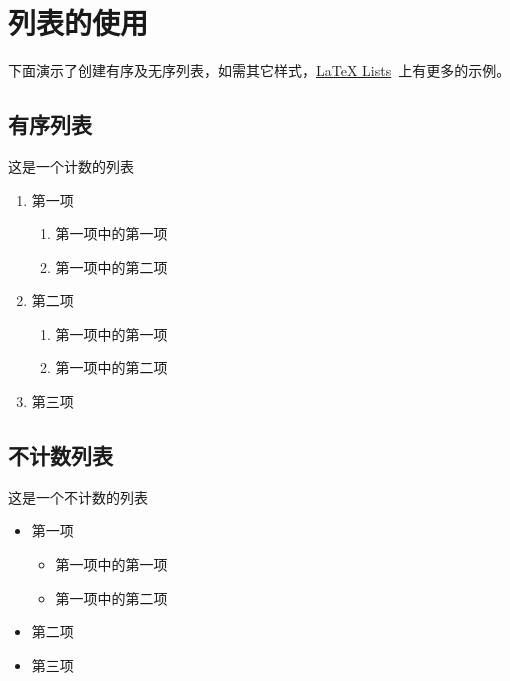 \section{列表的使用}
下面演示了创建有序及无序列表，如需其它样式，\href{https://www.latex-tutorial.com/tutorials/lists/}{LaTeX Lists}~上有更多的示例。

\subsection{有序列表}
这是一个计数的列表
  \begin{enumerate}
      \item 第一项
          \begin{enumerate}
              \item 第一项中的第一项
              \item 第一项中的第二项
          \end{enumerate}
      \item 第二项
    \begin{enumerate}[label=(\roman*)]
      \item 第一项中的第一项
      \item 第一项中的第二项
    \end{enumerate}
      \item 第三项
  \end{enumerate}

\subsection{不计数列表}
  这是一个不计数的列表
  \begin{itemize}
      \item 第一项
      \begin{itemize}
          \item 第一项中的第一项
          \item 第一项中的第二项
      \end{itemize}
      \item 第二项
      \item 第三项
  \end{itemize}